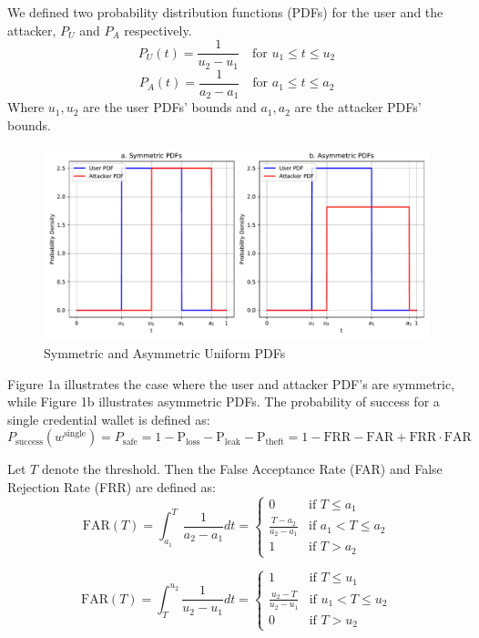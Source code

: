 \documentclass{article}
\begin{document}
We defined two probability distribution functions (PDFs) for the user and the attacker, $P_U$ and $P_A$ respectively.
\[
P_U(t) = \frac{1}{u_2-u_1} \quad \text{for } u_1 \leq t \leq u_2
\]
\[
P_A(t) = \frac{1}{a_2-a_1} \quad \text{for } a_1 \leq t \leq a_2
\]
Where $u_1, u_2$ are the user PDFs' bounds and $a_1, a_2$ are the attacker PDFs' bounds.
\begin{figure}[ht]
    \centering
    \includegraphics[width=\textwidth]{fig_uniforms.pdf}
    \caption{Symmetric and Asymmetric Uniform PDFs}
\end{figure}

Figure 1a illustrates the case where the user and attacker PDF's are symmetric, while Figure 1b illustrates asymmetric PDFs.
The probability of success for a single credential wallet is defined as:
\[
P_{\text{success}}(w^{\text{single}}) = P_{{\text{safe}}} = 1-\mathrm{P_{\text{loss}}}-\mathrm{P_{\text{leak}}}-\mathrm{P_{\text{theft}}}=1-\mathrm{FRR} - \mathrm{FAR} + \mathrm{FRR} \cdot \mathrm{FAR}
\]

Let $T$ denote the threshold. Then the False Acceptance Rate (FAR) and False Rejection Rate (FRR) are defined as:
\[
\text{FAR}(T) = \int_{a_1}^{T} \frac{1}{a_2-a_1} dt =
\left\{
\begin{array}{ll}
0 & \text{if } T \le a_1 \\
\frac{T-a_2}{a_2 - a_1} & \text{if } a_1 < T \le a_2 \\
1 & \text{if } T > a_2
\end{array}
\right.
\]

\[
\text{FAR}(T) = \int_{T}^{u_2} \frac{1}{u_2-u_1} dt =
\left\{
\begin{array}{ll}
1 & \text{if } T \le u_1 \\
\frac{u_2-T}{u_2 - u_1} & \text{if } u_1 < T \le u_2 \\
0 & \text{if } T > u_2
\end{array}
\right.
\]
\end{document}
